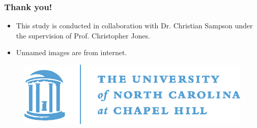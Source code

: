 \documentclass{beamer}
\begin{document}
\begin{frame}
\frametitle{Thank you!}

\begin{itemize}
\item This study is conducted in collaboration with Dr. Christian Sampson under the supervision of Prof. Christopher Jones.
\item Unnamed images are from internet.
\end{itemize}

\begin{figure}
\centering
\includegraphics[width=0.6\linewidth]{oldwell_cmyk}
\end{figure}
\end{frame}
%
\end{document}
